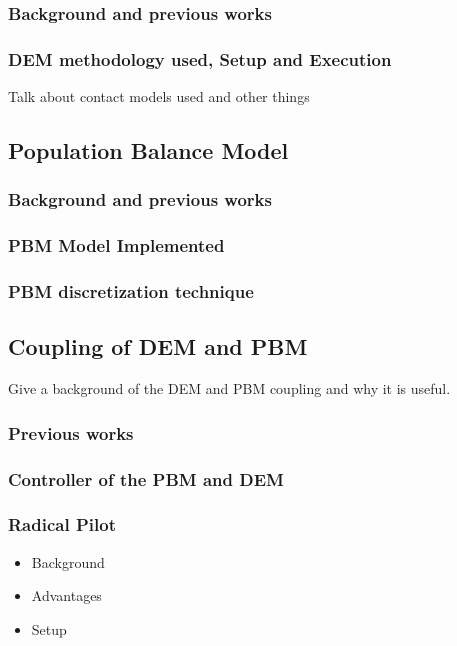 \documentclass[preprint,11pt,authoryear]{elsarticle}
\begin{document}
\subsubsection{Background and previous works}

\subsubsection{DEM methodology used, Setup and Execution}
Talk about contact models used and other things

\subsection{Population Balance Model}

\subsubsection{Background and previous works}

\subsubsection{PBM Model Implemented}

\subsubsection{PBM discretization technique}

\subsection{Coupling of DEM and PBM}
Give a  background of the DEM and PBM coupling and why it is useful.
\subsubsection{Previous works}

\subsubsection{Controller of the PBM and DEM}

\subsubsection{Radical Pilot}
\begin{itemize}
\item{Background}
\item{Advantages}
\item{Setup}
\end{itemize}
\end{document}
